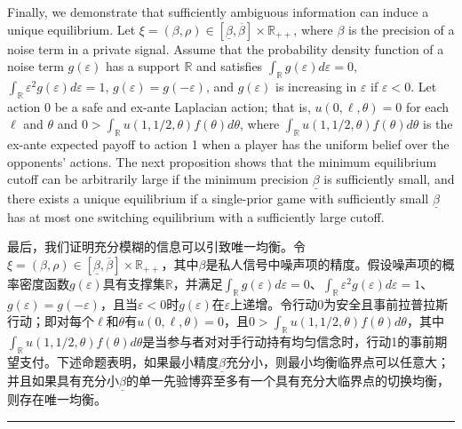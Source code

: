\documentclass[12pt,a4paper]{article}
\newenvironment{original}
  {\par\medskip\noindent\color{black}\ignorespaces}
  {\par\medskip}
\newenvironment{translation}
  {\par\noindent\color{darkblue}\ignorespaces}
  {\par\medskip\noindent\hrule\par\medskip}
\theoremstyle{definition}
\theoremstyle{remark}
\begin{document}
\begin{original}
Finally, we demonstrate that sufficiently ambiguous information can induce a unique equilibrium. Let $\xi = (\beta, \rho) \in [\underline{\beta}, \overline{\beta}] \times \mathbb{R}_{++}$, where $\beta$ is the precision of a noise term in a private signal. Assume that the probability density function of a noise term $g(\varepsilon)$ has a support $\mathbb{R}$ and satisfies $\int_{\mathbb{R}} g(\varepsilon) d\varepsilon = 0$, $\int_{\mathbb{R}} \varepsilon^2 g(\varepsilon) d\varepsilon = 1$, $g(\varepsilon) = g(-\varepsilon)$, and $g(\varepsilon)$ is increasing in $\varepsilon$ if $\varepsilon < 0$. Let action 0 be a safe and ex-ante Laplacian action; that is, $u(0, \ell, \theta) = 0$ for each $\ell$ and $\theta$ and $0 > \int_{\mathbb{R}} u(1, 1/2, \theta) f(\theta) d\theta$, where $\int_{\mathbb{R}} u(1, 1/2, \theta) f(\theta) d\theta$ is the ex-ante expected payoff to action 1 when a player has the uniform belief over the opponents' actions. The next proposition shows that the minimum equilibrium cutoff can be arbitrarily large if the minimum precision $\underline{\beta}$ is sufficiently small, and there exists a unique equilibrium if a single-prior game with sufficiently small $\underline{\beta}$ has at most one switching equilibrium with a sufficiently large cutoff.
\end{original}
\begin{translation}
最后，我们证明充分模糊的信息可以引致唯一均衡。令$\xi = (\beta, \rho) \in [\underline{\beta}, \overline{\beta}] \times \mathbb{R}_{++}$，其中$\beta$是私人信号中噪声项的精度。假设噪声项的概率密度函数$g(\varepsilon)$具有支撑集$\mathbb{R}$，并满足$\int_{\mathbb{R}} g(\varepsilon) d\varepsilon = 0$、$\int_{\mathbb{R}} \varepsilon^2 g(\varepsilon) d\varepsilon = 1$、$g(\varepsilon) = g(-\varepsilon)$，且当$\varepsilon < 0$时$g(\varepsilon)$在$\varepsilon$上递增。令行动0为安全且事前拉普拉斯行动；即对每个$\ell$和$\theta$有$u(0, \ell, \theta) = 0$，且$0 > \int_{\mathbb{R}} u(1, 1/2, \theta) f(\theta) d\theta$，其中$\int_{\mathbb{R}} u(1, 1/2, \theta) f(\theta) d\theta$是当参与者对对手行动持有均匀信念时，行动1的事前期望支付。下述命题表明，如果最小精度$\underline{\beta}$充分小，则最小均衡临界点可以任意大；并且如果具有充分小$\underline{\beta}$的单一先验博弈至多有一个具有充分大临界点的切换均衡，则存在唯一均衡。
\end{translation}
\end{document}
